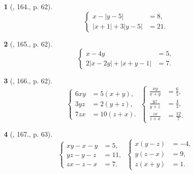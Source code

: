 \documentclass{article}
\newtheorem{baitoan}{}
\begin{document}
\begin{baitoan}[\cite{Tuyen_Toan_9_old}, 164., p. 62]
	\begin{equation*}
		\left\{\begin{split}
			x - |y - 5| &= 8,\\
			|x + 1| + 3|y - 5| &= 21.
		\end{split}\right.
	\end{equation*}
\end{baitoan}

\begin{baitoan}[\cite{Tuyen_Toan_9_old}, 165., p. 62]
	\begin{equation*}
		\left\{\begin{split}
			x - 4y &= 5,\\
			2|x - 2y| + |x + y - 1| &= 7.
		\end{split}\right.
	\end{equation*}
\end{baitoan}

\begin{baitoan}[\cite{Tuyen_Toan_9_old}, 166., p. 62]
	\begin{equation*}
		\left\{\begin{split}
			6xy &= 5(x + y),\\
			3yz &= 2(y + z),\\
			7zx &= 10(z + x).
		\end{split}\right.\ \left\{\begin{split}
		\frac{xy}{x + y} &= \frac{6}{5},\\
		\frac{yz}{y + z} &= \frac{4}{3},\\
		\frac{zx}{z + x} &= \frac{12}{7}.
		\end{split}\right.
	\end{equation*}
\end{baitoan}

\begin{baitoan}[\cite{Tuyen_Toan_9_old}, 167., p. 63]
	\begin{equation*}
		\left\{\begin{split}
			xy - x - y &= 5,\\
			yz - y - z &= 11,\\
			zx - z - x &= 7.
		\end{split}\right.\ \left\{\begin{split}
			x(y - z) &= -4,\\
			y(z - x) &= 9,\\
			z(x + y) &= 1.
		\end{split}\right.
	\end{equation*}
\end{baitoan}
\end{document}
